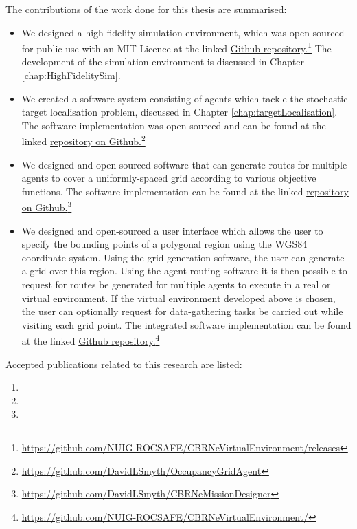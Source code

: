 The contributions of the work done for this thesis are summarised:
\begin{itemize}
    \item We designed a high-fidelity simulation environment, which was open-sourced for public use with an MIT Licence at the linked \href{https://github.com/NUIG-ROCSAFE/CBRNeVirtualEnvironment/releases}{Github repository.}\footnote{\href {https://github.com/NUIG-ROCSAFE/CBRNeVirtualEnvironment/releases}{https://github.com/NUIG-ROCSAFE/CBRNeVirtualEnvironment/releases}} The development of the simulation environment is discussed in Chapter \ref{chap:HighFidelitySim}.
    \item We created a software system consisting of agents which tackle the stochastic target localisation problem, discussed in Chapter \ref{chap:targetLocalisation}. The software implementation was open-sourced and can be found at the linked 
    \href{https://github.com/DavidLSmyth/OccupancyGridAgent}{repository on Github.}\footnote{\href {https://github.com/DavidLSmyth/OccupancyGridAgent}{https://github.com/DavidLSmyth/OccupancyGridAgent}} 
    \item We designed and open-sourced software that can generate routes for multiple agents to cover a uniformly-spaced grid according to various objective functions. The software implementation can be found at the linked 
    \href{https://github.com/DavidLSmyth/CBRNeMissionDesigner}{repository on Github.}\footnote{\href {https://github.com/DavidLSmyth/CBRNeMissionDesigner}{https://github.com/DavidLSmyth/CBRNeMissionDesigner}}
    \item We designed and open-sourced a user interface which allows the user to specify the bounding points of a polygonal region using the WGS84 coordinate system. Using the grid generation  software, the user can generate a grid over this region. Using the agent-routing software it is then possible to request for routes be generated for multiple agents to execute in a real or virtual environment. If the virtual environment developed above is chosen, the user can optionally request for data-gathering tasks be carried out while visiting each grid point. The integrated software implementation can be found at the linked \href{https://github.com/NUIG-ROCSAFE/CBRNeVirtualEnvironment/}{Github repository.}\footnote{\href {https://github.com/NUIG-ROCSAFE/CBRNeVirtualEnvironment/}{https://github.com/NUIG-ROCSAFE/CBRNeVirtualEnvironment/}}
\end{itemize}

Accepted publications related to this research are listed:
\begin{enumerate}
    \item {}
    \item {}
    \item {}

\end{enumerate}
